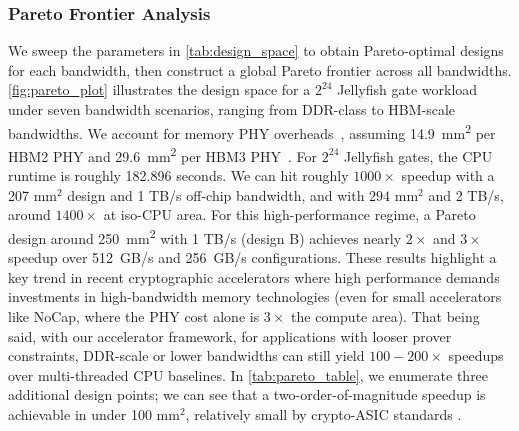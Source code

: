 \begin{table}[t!]
\centering
\caption{Runtime, Area, and Bandwidth for Globally Pareto-optimal zkPHIRE Designs in Figure \ref{fig:pareto_plot}.}
\label{tab:pareto_table}
\end{table}


\subsubsection{Pareto Frontier Analysis}

We sweep the parameters in \autoref{tab:design_space} to obtain Pareto-optimal designs for each bandwidth, then construct a global Pareto frontier across all bandwidths.
\autoref{fig:pareto_plot} illustrates the design space for a $2^{24}$ Jellyfish gate workload under seven bandwidth scenarios, ranging from DDR-class to HBM-scale bandwidths.
We account for memory PHY overheads~\cite{nocap, osiris, haac, hbm2, samardzic2021_F1, craterlake, ark, sharp}, assuming 14.9~mm\textsuperscript{2} per HBM2 PHY and 29.6~mm\textsuperscript{2} per HBM3 PHY~\cite{hbm3}.
For $2^{24}$ Jellyfish gates, the CPU runtime is roughly 182.896 seconds. We can hit roughly $1000\times$ speedup with a 207 mm$^2$ design and 1 TB/s off-chip bandwidth, and with $294$ mm$^2$ and 2 TB/s, around $1400\times$ at iso-CPU area.
For this high-performance regime, a Pareto design around 250~mm\textsuperscript{2} with 1 TB/s (design B) achieves nearly $2\times$ and $3\times$ speedup over 512~GB/s and 256~GB/s configurations. These results highlight a key trend in recent cryptographic accelerators where high performance demands investments in high-bandwidth memory technologies (even for small accelerators like NoCap, where the PHY cost alone is $3\times$ the compute area). That being said, with our accelerator framework, for applications with looser prover constraints, DDR-scale or lower bandwidths can still yield $100-200\times$ speedups over multi-threaded CPU baselines. In \autoref{tab:pareto_table}, we enumerate three additional design points; we can see that a two-order-of-magnitude speedup is achievable in under 100 mm$^2$, relatively small by crypto-ASIC standards \cite{kim2022_BTS, craterlake, ark, reagen2021cheetah}.

